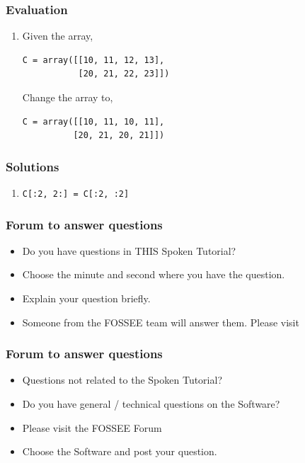 \documentclass[17pt]{beamer}
\newcounter{saveenumi}
\newcommand{\conti}{\setcounter{enumi}{\value{saveenumi}}}
\begin{document}
\begin{frame}[fragile]
\frametitle{Evaluation}
\label{sec-14.2}
\begin{enumerate}
\conti
\item Given the array,
\lstset{language=Python}
\begin{lstlisting}
C = array([[10, 11, 12, 13],   
           [20, 21, 22, 23]])
\end{lstlisting}
Change the array to, 
\begin{lstlisting}
C = array([[10, 11, 10, 11],
          [20, 21, 20, 21]])
\end{lstlisting}
\end{enumerate}
\end{frame}
\begin{frame}
\frametitle{Solutions}
\label{sec-15}
\begin{enumerate}
\item \texttt{C[:2, 2:] = C[:2, :2]}
\end{enumerate}
\end{frame}
\begin{frame}
\frametitle{Forum to answer questions}
\begin{itemize}
\item Do you have questions in THIS Spoken Tutorial?
\item Choose the minute and second where you have the question.
\item Explain your question briefly.
\item Someone from the FOSSEE team will answer them. Please visit 
\end{itemize}
\begin{center}
{\color{blue}{http://forums.spoken-tutorial.org/}}
 \end{center} 
\end{frame}
\begin{frame}
\frametitle{Forum to answer questions}
\begin{itemize}
\item Questions not related to the Spoken Tutorial?
\item Do you have general / technical questions on the Software?
\item Please visit the FOSSEE Forum
\begin{center}
{\color{blue}{http://forums.fossee.in/}}
 \end{center}
\item Choose the Software and post your question.
\end{itemize}
\end{frame}
\end{document}
